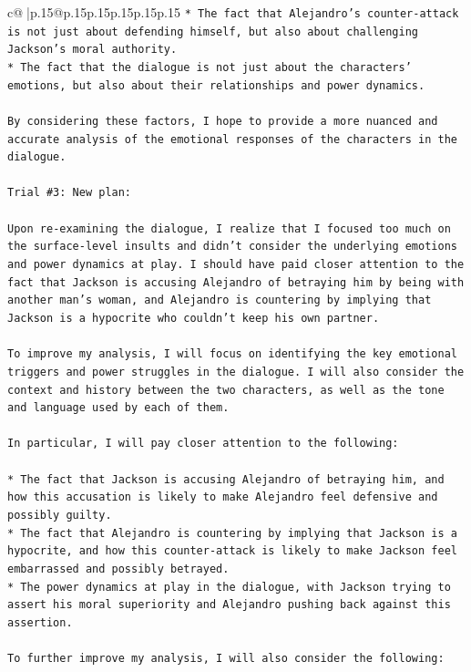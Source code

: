 \documentclass{article}
\begin{document}
{\begin{supertabular}{c@{$\;$}|p{.15\linewidth}@{}p{.15\linewidth}p{.15\linewidth}p{.15\linewidth}p{.15\linewidth}p{.15\linewidth}}
{{{\texttt{* The fact that Alejandro's counter{-}attack is not just about defending himself, but also about challenging Jackson's moral authority.} \\
\texttt{* The fact that the dialogue is not just about the characters' emotions, but also about their relationships and power dynamics.} \\
\\ 
\texttt{By considering these factors, I hope to provide a more nuanced and accurate analysis of the emotional responses of the characters in the dialogue.} \\
\\ 
\texttt{Trial \#3: New plan: } \\
\\ 
\texttt{Upon re{-}examining the dialogue, I realize that I focused too much on the surface{-}level insults and didn't consider the underlying emotions and power dynamics at play. I should have paid closer attention to the fact that Jackson is accusing Alejandro of betraying him by being with another man's woman, and Alejandro is countering by implying that Jackson is a hypocrite who couldn't keep his own partner.} \\
\\ 
\texttt{To improve my analysis, I will focus on identifying the key emotional triggers and power struggles in the dialogue. I will also consider the context and history between the two characters, as well as the tone and language used by each of them.} \\
\\ 
\texttt{In particular, I will pay closer attention to the following:} \\
\\ 
\texttt{* The fact that Jackson is accusing Alejandro of betraying him, and how this accusation is likely to make Alejandro feel defensive and possibly guilty.} \\
\texttt{* The fact that Alejandro is countering by implying that Jackson is a hypocrite, and how this counter{-}attack is likely to make Jackson feel embarrassed and possibly betrayed.} \\
\texttt{* The power dynamics at play in the dialogue, with Jackson trying to assert his moral superiority and Alejandro pushing back against this assertion.} \\
\\ 
\texttt{To further improve my analysis, I will also consider the following:} \\
\\ 
}}}
\end{supertabular}}
\end{document}

